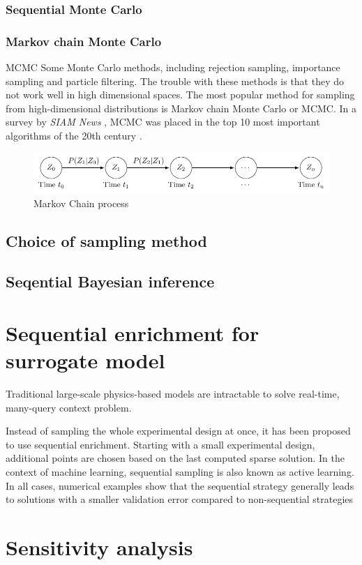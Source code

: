 \subsubsection{Sequential Monte Carlo}


\subsubsection{Markov chain Monte Carlo}

\acrshort{MCMC}
Some Monte Carlo methods, including rejection sampling, importance sampling and particle filtering. The trouble with these methods is that they do not work well in high
dimensional spaces. The most popular method for sampling from high-dimensional distributions
is Markov chain Monte Carlo or MCMC. In a survey by \textit{SIAM News}
, MCMC was placed in the
top 10 most important algorithms of the 20th century \citep{murphy2012}.
\begin{figure}[H]
    \centering
    \includegraphics[width = 140mm]{Figures/figure-markov_process.pdf}
    \caption{Markov Chain process}
    \label{fig: markovchain}
\end{figure}


\subsection{Choice of sampling method}


\subsection{Seqential Bayesian inference}


\section{Sequential enrichment for surrogate model}

Traditional large-scale physics-based models are intractable to solve real-time, many-query context problem. 


Instead of sampling the whole experimental design at once, it has been proposed to use sequential enrichment. Starting with
a small experimental design, additional points are chosen based on the last computed sparse
solution. In the context of machine learning, sequential sampling is also known as active learning.  In all cases, numerical examples show that the sequential strategy generally leads to solutions with
a smaller validation error compared to non-sequential strategies

\section{Sensitivity analysis}